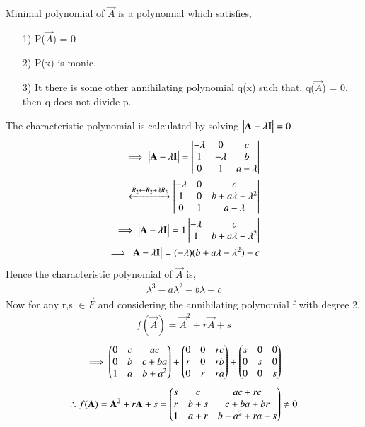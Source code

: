 Minimal polynomial of $\vec{A}$ is a polynomial which satisfies,
\begin{enumerate}
\item[1)] P($\vec{A}$) = 0
\item[2)] P(x) is monic.
\item[3)] It there is some other annihilating polynomial q(x) such that, q($\vec{A}$) = 0, then q does not divide p. 
\end{enumerate}
The characteristic polynomial is calculated by solving $\begin{vmatrix}\mathbf{A}-\lambda \mathbf{I}\end{vmatrix} = 0$
\begin{align}
\implies \begin{vmatrix}\mathbf{A}-\lambda \mathbf{I}\end{vmatrix} = \begin{vmatrix}-\lambda &0&c\\1&-\lambda &b\\0&1&a-\lambda\end{vmatrix}\\
\xleftrightarrow[]{R_2\leftarrow R_2+\lambda R_3} \begin{vmatrix}-\lambda &0&c\\1&0&b+a\lambda-\lambda^2\\0&1&a-\lambda\end{vmatrix}\\
\implies \begin{vmatrix}\mathbf{A}-\lambda \mathbf{I}\end{vmatrix} = 1\begin{vmatrix}-\lambda & c \\1 & b+a\lambda-\lambda^2\end{vmatrix}\\
\implies \begin{vmatrix}\mathbf{A}-\lambda \mathbf{I}\end{vmatrix} = (-\lambda)( b+a\lambda-\lambda^2) - c
\end{align}
Hence the characteristic polynomial of $\vec{A}$ is,
\begin{align}
\lambda^3-a\lambda^2-b\lambda-c
\label{eq:solutions/6/3/2/cp}
\end{align}
Now for any r,s $\in \vec{F}$ and considering the annihilating polynomial f with degree 2.
\begin{align}
f(\vec{A}) = \vec{A}^2+r\vec{A}+s
\end{align}
\begin{align}
\implies \begin{pmatrix}0&c&ac\\0&b&c+ba\\1&a&b+a^2\end{pmatrix} + \begin{pmatrix}0&0&rc\\r&0&rb\\0&r&ra\end{pmatrix}+ \begin{pmatrix}s&0&0\\0&s&0\\0&0&s\end{pmatrix}
\end{align}
\begin{align}
\therefore f(\mathbf{A}) = \mathbf{A}^2+r\mathbf{A}+s = \begin{pmatrix}s&c&ac+rc\\r&b+s&c+ba+br\\1&a+r&b+a^2+ra+s\end{pmatrix} \neq 0
\label{eq:solutions/6/3/2/fa}
\end{align}
